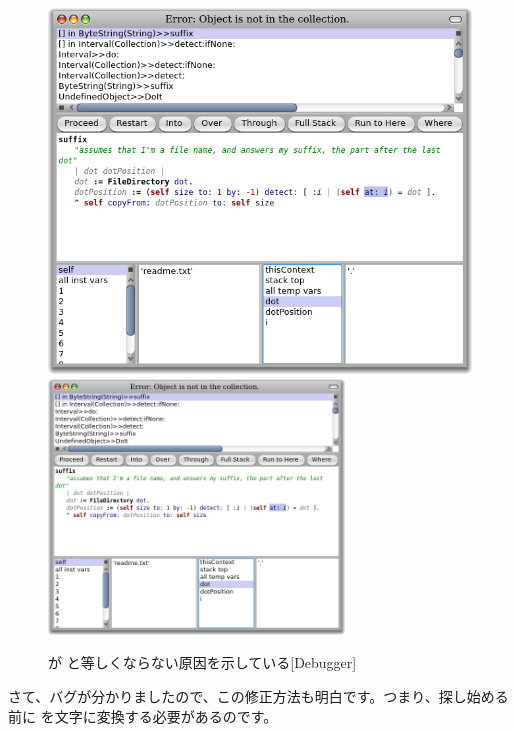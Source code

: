 \documentclass[a4paper,10pt,twoside]{book}
\begin{document}
\begin{figure}[btp]
	\begin{center}
	\ifluluelse
		{\includegraphics[width=\textwidth]{dotIsAString}}
		{\includegraphics[width=0.7\textwidth]{dotIsAString}}
	\end{center}
	\caption{ が  と等しくならない原因を示している[Debugger]}
\end{figure}

さて、バグが分かりましたので、この修正方法も明白です。つまり、探し始める前に  を文字に変換する必要があるのです。
\end{document}
